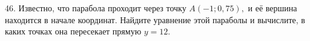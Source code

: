 46. Известно, что парабола проходит через точку $A(-1;0,75),$ и её вершина находится в начале координат. Найдите уравнение этой параболы и вычислите, в каких точках она пересекает прямую $y=12.$\\
